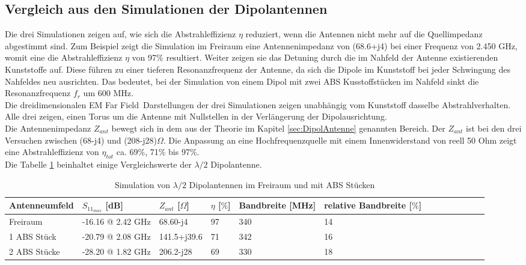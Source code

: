 \subsection{Vergleich aus den Simulationen der Dipolantennen}
Die drei Simulationen zeigen auf, wie sich die Abstrahleffizienz $\eta$ reduziert, wenn die Antennen nicht mehr auf die Quellimpedanz abgestimmt sind. Zum Beispiel zeigt die Simulation im Freiraum eine Antennenimpedanz von (68.6+j4) bei einer Frequenz von 2.450 GHz, womit eine die Abstrahleffizienz $\eta$ von 97$\%$ resultiert. Weiter zeigen sie das Detuning durch die im Nahfeld der Antenne existierenden Kunststoffe auf. Diese führen zu einer tieferen Resonanzfrequenz der Antenne, da sich die Dipole im Kunststoff bei jeder Schwingung des Nahfeldes neu ausrichten. Das bedeutet, bei der Simulation von einem Dipol mit zwei ABS Kusstoffstücken im Nahfeld sinkt die Resonanzfrequenz $f_{r}$ um 600 MHz.\\ 
Die dreidimensionalen \glqq EM Far Field\grqq \ Darstellungen der drei Simulationen zeigen unabhängig vom Kunststoff dasselbe Abstrahlverhalten. Alle drei zeigen, einen Torus um die Antenne mit Nullstellen in der Verlängerung der Dipolausrichtung.\\
Die Antennenimpedanz $Z_{ant}$ bewegt sich in dem aus der Theorie im Kapitel \ref{sec:DipolAntenne} genannten Bereich. Der $Z_{ant}$ ist bei den drei Versuchen zwischen (68-j4) und (208-j28)$\Omega$. Die Anpassung an eine Hochfrequenzquelle mit einem Innenwiderstand von reell 50 Ohm zeigt eine Abstrahleffizienz von $\eta_{tot}$ ca. 69\%, 71\% bis 97\%.\\
Die Tabelle \ref{tab:Evaluation_Vergeich_Dipolantennen} beinhaltet einige Vergleichswerte der $\lambda/2$ Dipolantenne.
\begin{table}[!h]
 \centering
 \begin{tabular}{p{3cm} p{4cm} p{2cm} p{1.5cm} p{2cm} p{2.5cm} l c c c c p r} 
 \toprule 
 Antenneumfeld & $S_{11_{max}}$ [dB]		& $Z_{ant}$ [$\Omega$] 	& $\eta$ [$\%$] & Bandbreite [MHz] & relative Bandbreite [$\%$]\\ 
 \midrule
 Freiraum 			&	-16.16 @ 2.42 GHz		& 	68.60-j4			& 	97	&	340 & 14\\ 		
1 ABS Stück 	& -20.79 @ 2.08 GHz 		&	141.5+j39.6		&	71	&	342	 & 16 \\
2 ABS Stücke 	& -28.20 @ 1.82 GHz 	&	206.2-j28		&	69	&	330	 & 18 \\
 \bottomrule
 \end{tabular}
 \caption{Simulation von $\lambda/2$ Dipolantennen im Freiraum und mit ABS Stücken}
 \label{tab:Evaluation_Vergeich_Dipolantennen}
\end{table}

